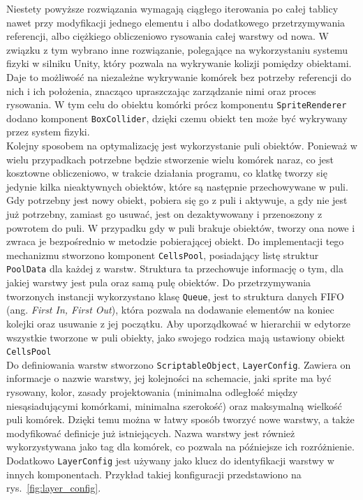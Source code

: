 Niestety powyższe rozwiązania wymagają ciągłego iterowania po całej tablicy nawet przy modyfikacji jednego elementu
i albo dodatkowego przetrzymywania referencji, albo ciężkiego obliczeniowo rysowania całej warstwy od nowa.
W związku z tym wybrano inne rozwiązanie, polegające na wykorzystaniu systemu fizyki w silniku Unity,
który pozwala na wykrywanie kolizji pomiędzy obiektami.
Daje to możliwość na niezależne wykrywanie komórek bez potrzeby referencji do nich i ich położenia,
znacząco upraszczając zarządzanie nimi oraz proces rysowania.
W tym celu do obiektu komórki prócz komponentu \texttt{SpriteRenderer} dodano komponent \texttt{BoxCollider},
dzięki czemu obiekt ten może być wykrywany przez system fizyki.\\
\indent Kolejny sposobem na optymalizację jest wykorzystanie puli obiektów.
Ponieważ w wielu przypadkach potrzebne będzie stworzenie wielu komórek naraz, co jest kosztowne obliczeniowo,
w trakcie działania programu, co klatkę tworzy się jedynie kilka nieaktywnych obiektów, które są następnie przechowywane w puli.
Gdy potrzebny jest nowy obiekt, pobiera się go z puli i aktywuje, a gdy nie jest już potrzebny,
zamiast go usuwać, jest on dezaktywowany i przenoszony z powrotem do puli.
W przypadku gdy w puli brakuje obiektów, tworzy ona nowe i zwraca je bezpośrednio w metodzie pobierającej obiekt.
Do implementacji tego mechanizmu stworzono komponent \texttt{CellsPool},
posiadający listę struktur \texttt{PoolData} dla każdej z warstw.
Struktura ta przechowuje informację o tym, dla jakiej warstwy jest pula oraz samą pulę obiektów.
Do przetrzymywania tworzonych instancji wykorzystano klasę \texttt{Queue},
jest to struktura danych FIFO (ang. \textit{First In, First Out}),
która pozwala na dodawanie elementów na koniec kolejki oraz usuwanie z jej początku.
Aby uporządkować w hierarchii w edytorze wszystkie tworzone w puli obiekty,
jako swojego rodzica mają ustawiony obiekt \texttt{CellsPool}\\
\indent Do definiowania warstw stworzono \texttt{ScriptableObject}, \texttt{LayerConfig}.
Zawiera on informacje o nazwie warstwy, jej kolejności na schemacie, jaki sprite ma być rysowany, kolor,
zasady projektowania (minimalna odległość między niesąsiadującymi komórkami, minimalna szerokość)
oraz maksymalną wielkość puli komórek.
Dzięki temu można w łatwy sposób tworzyć nowe warstwy, a także modyfikować definicje już istniejących.
Nazwa warstwy jest również wykorzystywana jako tag dla komórek, co pozwala na późniejsze ich rozróżnienie.
Dodatkowo \texttt{LayerConfig} jest używany jako klucz do identyfikacji warstwy w innych komponentach.
Przykład takiej konfiguracji przedstawiono na rys.~\ref{fig:layer_config}.

